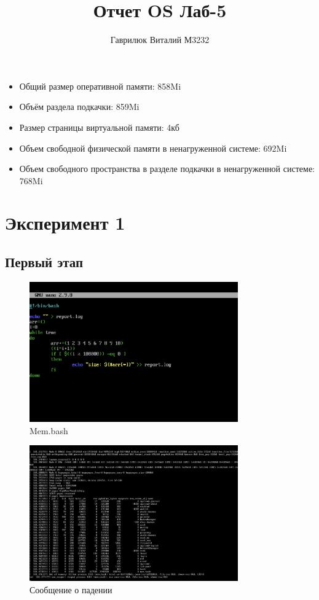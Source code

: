 \documentclass{article}
\title{Отчет OS Лаб-5}
\author{Гаврилюк Виталий М3232}
\date{}
\begin{document}
\maketitle

\begin{itemize}
\item Общий размер оперативной памяти: 858Mi 
\item Объём раздела подкачки: 859Mi 
\item Размер страницы виртуальной памяти: 4кб 
\item Объем свободной физической памяти в ненагруженной системе: 692Mi 
\item Объем свободного пространства в разделе подкачки в ненагруженной системе: 768Mi 
\end{itemize}

\section*{Эксперимент 1}

\subsection*{Первый этап} 

\begin{figure}[H]
\centering
\includegraphics[width=0.8\textwidth]{images/1.png}
\caption{Mem.bash}
\end{figure} 

\begin{figure}[H]
\centering
\includegraphics[width=0.8\textwidth]{images/2.png}
\caption{Сообщение о падении}
\end{figure}
\end{document}
